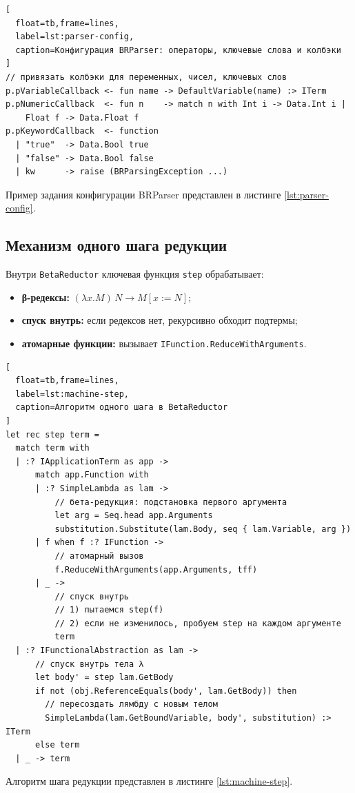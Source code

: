 \begin{itemize}
\begin{lstlisting}[
  float=tb,frame=lines,
  label=lst:parser-config,
  caption=Конфигурация BRParser: операторы, ключевые слова и колбэки
]
// привязать колбэки для переменных, чисел, ключевых слов
p.pVariableCallback <- fun name -> DefaultVariable(name) :> ITerm
p.pNumericCallback  <- fun n    -> match n with Int i -> Data.Int i | 
    Float f -> Data.Float f
p.pKeywordCallback  <- function
  | "true"  -> Data.Bool true
  | "false" -> Data.Bool false
  | kw      -> raise (BRParsingException ...)
\end{lstlisting}

Пример задания конфигурации BRParser представлен в листинге \ref{lst:parser-config}.

\subsection{Механизм одного шага редукции}
Внутри \texttt{BetaReductor} ключевая функция \texttt{step} обрабатывает:
\begin{itemize}
  \item \textbf{β-редексы:} $(\lambda x.M)\,N \to M[x:=N]$;
  \item \textbf{спуск внутрь:} если редексов нет, рекурсивно обходит подтермы;
  \item \textbf{атомарные функции:} вызывает \texttt{IFunction.ReduceWithArguments}.
\end{itemize}

\begin{lstlisting}[
  float=tb,frame=lines,
  label=lst:machine-step,
  caption=Алгоритм одного шага в BetaReductor
]
let rec step term =
  match term with
  | :? IApplicationTerm as app ->
      match app.Function with
      | :? SimpleLambda as lam ->
          // бета-редукция: подстановка первого аргумента
          let arg = Seq.head app.Arguments
          substitution.Substitute(lam.Body, seq { lam.Variable, arg })
      | f when f :? IFunction ->
          // атомарный вызов
          f.ReduceWithArguments(app.Arguments, tff)
      | _ ->
          // спуск внутрь
          // 1) пытаемся step(f)
          // 2) если не изменилось, пробуем step на каждом аргументе
          term
  | :? IFunctionalAbstraction as lam ->
      // спуск внутрь тела λ
      let body' = step lam.GetBody
      if not (obj.ReferenceEquals(body', lam.GetBody)) then
        // пересоздать лямбду с новым телом
        SimpleLambda(lam.GetBoundVariable, body', substitution) :> ITerm
      else term
  | _ -> term
\end{lstlisting}

Алгоритм шага редукции представлен в листинге \ref{lst:machine-step}.


\end{itemize}
